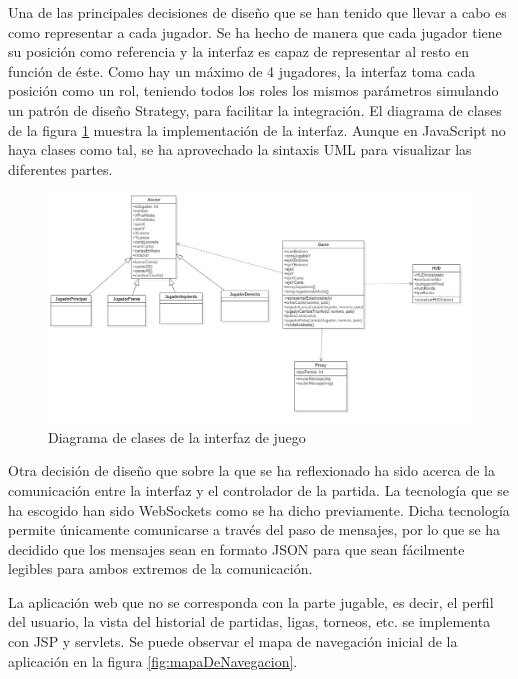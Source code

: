 Una de las principales decisiones de diseño que se han tenido que llevar a cabo es como representar a cada jugador. Se ha hecho de manera que cada jugador tiene su posición como referencia y la interfaz es capaz de representar al resto en función de éste. Como hay un máximo de 4 jugadores, la interfaz toma cada posición como un rol,  teniendo todos los roles los mismos parámetros simulando un patrón de diseño Strategy, para facilitar la integración. El diagrama de clases de la figura \ref{fig:clasesInterfazJuego} muestra la implementación de la interfaz. Aunque en JavaScript no haya clases como tal, se ha aprovechado la sintaxis UML para visualizar las diferentes partes.

\begin{figure}[H]
  \includegraphics[width=\linewidth]{figuras/clasesInterfazJuego.png}
  \caption{Diagrama de clases de la interfaz de juego}
  \label{fig:clasesInterfazJuego}
\end{figure}

Otra decisión de diseño que sobre la que se ha reflexionado ha sido acerca de la comunicación entre la interfaz y el controlador de la partida. La tecnología que se ha escogido han sido WebSockets como se ha dicho previamente. Dicha tecnología permite únicamente comunicarse a través del paso de mensajes, por lo que se ha decidido que los mensajes sean en formato JSON para que sean fácilmente legibles para ambos extremos de la comunicación.

La aplicación web que no se corresponda con la parte jugable, es decir, el perfil del usuario, la vista del historial de partidas, ligas, torneos, etc. se implementa con JSP y servlets. Se puede observar el mapa de navegación inicial de la aplicación en la figura \ref{fig:mapaDeNavegacion}.

